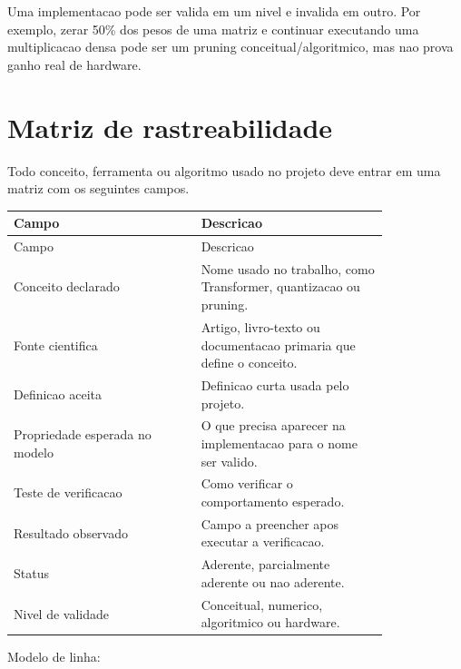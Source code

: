 Uma implementacao pode ser valida em um nivel e invalida em outro. Por exemplo, zerar 50\% dos pesos de uma matriz e continuar executando uma multiplicacao densa pode ser um pruning conceitual/algoritmico, mas nao prova ganho real de hardware.



\section{Matriz de rastreabilidade}




Todo conceito, ferramenta ou algoritmo usado no projeto deve entrar em uma matriz com os seguintes campos.



\begin{longtable}{@{}>{\RaggedRight\arraybackslash}p{0.410\linewidth}>{\RaggedRight\arraybackslash}p{0.410\linewidth}@{}}
\toprule
Campo & Descricao \\
\midrule
\endfirsthead
\toprule
Campo & Descricao \\
\midrule
\endhead
Conceito declarado & Nome usado no trabalho, como Transformer, quantizacao ou pruning. \\
Fonte cientifica & Artigo, livro-texto ou documentacao primaria que define o conceito. \\
Definicao aceita & Definicao curta usada pelo projeto. \\
Propriedade esperada no modelo & O que precisa aparecer na implementacao para o nome ser valido. \\
Teste de verificacao & Como verificar o comportamento esperado. \\
Resultado observado & Campo a preencher apos executar a verificacao. \\
Status & Aderente, parcialmente aderente ou nao aderente. \\
Nivel de validade & Conceitual, numerico, algoritmico ou hardware. \\
\bottomrule
\end{longtable}



Modelo de linha:



